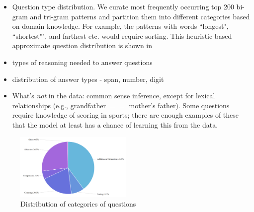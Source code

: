 \begin{itemize}
    \item Question type distribution. We curate most frequently occurring top 200 bi-gram and tri-gram patterns and partition them into different categories based on domain knowledge. For example, the patterns with words ``longest", ``shortest"", and farthest etc. would require sorting.
   This heuristic-based approximate question distribution is shown in 
    \item types of reasoning needed to answer questions 
    \item distribution of answer types - span, number, digit
    \item What's \emph{not} in the data: common sense inference, except for lexical relationships (e.g., grandfather $==$ mother's father).  Some questions require knowledge of scoring in sports; there are enough examples of these that the model at least has a chance of learning this from the data.
\end{itemize}

\begin{figure}
    \centering
    \includegraphics[width=0.5\textwidth]{images/answer_distrib}
    \caption{Distribution of categories of questions}
    \label{fig:answer_distrib}
\end{figure}

